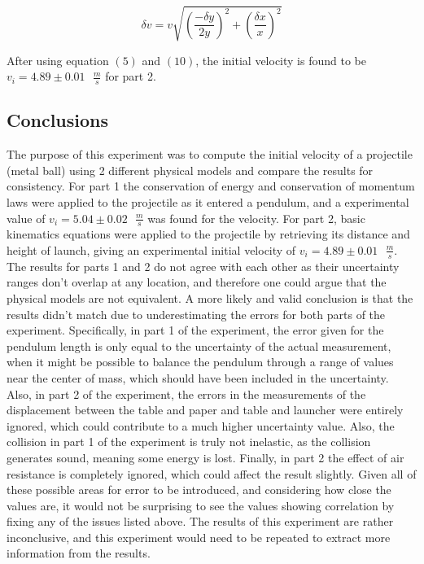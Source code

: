 \documentclass[11pt]{article}
\begin{document}
\begin{equation}
\delta v = v \sqrt{(\frac{-\delta y}{2y})^2 + (\frac{\delta x}{x})^2}
\end{equation}

After using equation \((5)\) and \((10)\), the initial velocity is found
to be \(v_i = 4.89 \pm 0.01\text{ }\frac {m}{s}\) for part 2.

\hypertarget{conclusions}{%
\subsection*{\centering Conclusions}\label{conclusions}}

The purpose of this experiment was to compute the initial velocity of a
projectile (metal ball) using 2 different physical models and compare
the results for consistency. For part 1 the conservation of energy and
conservation of momentum laws were applied to the projectile as it
entered a pendulum, and a experimental value of
\(v_i = 5.04 \pm 0.02\text{ }\frac {m}{s}\) was found for the velocity.
For part 2, basic kinematics equations were applied to the projectile by
retrieving its distance and height of launch, giving an experimental
initial velocity of \(v_i = 4.89 \pm 0.01\text{ }\frac {m}{s}\). The
results for parts 1 and 2 do not agree with each other as their
uncertainty ranges don't overlap at any location, and therefore one
could argue that the physical models are not equivalent. A more likely
and valid conclusion is that the results didn't match due to
underestimating the errors for both parts of the experiment.
Specifically, in part 1 of the experiment, the error given for the
pendulum length is only equal to the uncertainty of the actual
measurement, when it might be possible to balance the pendulum through a
range of values near the center of mass, which should have been included
in the uncertainty. Also, in part 2 of the experiment, the errors in the
measurements of the displacement between the table and paper and table
and launcher were entirely ignored, which could contribute to a much
higher uncertainty value. Also, the collision in part 1 of the
experiment is truly not inelastic, as the collision generates sound,
meaning some energy is lost. Finally, in part 2 the effect of air
resistance is completely ignored, which could affect the result
slightly. Given all of these possible areas for error to be introduced,
and considering how close the values are, it would not be surprising to
see the values showing correlation by fixing any of the issues listed
above. The results of this experiment are rather inconclusive, and this
experiment would need to be repeated to extract more information from
the results.


    
    
    
\end{document}
